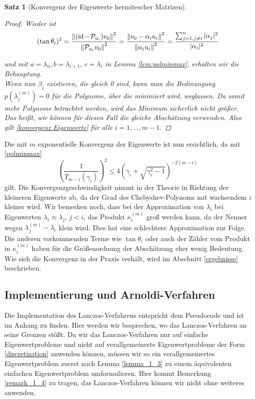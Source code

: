 \documentclass{article}
\theoremstyle{plain}
\newtheorem{theorem}    {Satz}   [section]
\begin{document}
\begin{theorem}[Konvergenz der Eigenwerte hermitescher Matrizen]
\begin{proof}
	Wieder ist
	\begin{equation*}
		(\tan\theta_i)^2 = \frac{{\left \| (\operatorname{id} - \mathcal{P}_{u_i})v_0 \right \|}_{}^2}{{\left \|  \mathcal{P}_{u_i}v_0 \right \|}_{}^2} = \frac{{\left \| v_0 - \alpha_i u_i \right \|}_{}^2}{{\left \| \alpha_i u_i \right \|}_{}^2} = \frac{\sum_{\substack{j=1, j\neq i}}^{n} |\alpha_j|^2}{|\alpha_i|^2}
	\end{equation*}

	und  mit $a = \lambda_n, b= \lambda_{i+1}$, $c = \lambda_i$ in Lemma \ref{lem:polminmax}, erhalten wir die Behauptung.\\

	Wenn nun $\beta_j$ existieren, die gleich 0 sind, kann man die Bedinungung $p(\lambda_j^{(m)}) = 0$ für die Polynome, über die minimiert wird, weglassen.
	Da somit mehr Polynome betrachtet werden, wird das Minimum sicherlich nicht größer. Das heißt, wir können für diesen Fall die gleiche Abschätzung verwenden.
	Also gilt \eqref{konvergenz Eigenwerte} für alle $i = 1, \dots, m-1$.
	\end{proof}
\end{theorem}

Die mit $m$ exponentielle Konvergenz der Eigenwerte ist nun ersichtlich, da mit \eqref{polminmax}
\begin{equation*}
	\left(\frac{1}{T_{m-i}(\gamma_i)}\right)^2 \le 4 \left(\gamma_i + \sqrt{\gamma_i^2 -1}\right)^{-2(m-i)}
\end{equation*}
gilt. Die Konvergenzgeschwindigkeit nimmt in der Theorie in Richtung der kleineren Eigenwerte ab, da der Grad des Chebyshev-Polynoms mit wachsendem $i$ kleiner wird. Wir bemerken noch, dass bei der Approximation von $\lambda_i$ bei Eigenwerten $\lambda_i \approx \lambda_j, \, j < i$, das Produkt $\kappa_i^{(m)}$ groß werden kann, da der Nenner wegen $\lambda^{(m)}_j - \lambda_i$ klein wird. Dies hat eine schlechtere Approximation zur Folge. Die anderen vorkommenden Terme wie $\tan \theta_i$ oder auch der Zähler vom Produkt in $\kappa_i^{(m)}$ haben für die Größenordnung der Abschätzung eher wenig Bedeutung. Wie sich die Konvergenz in der Praxis verhält, wird im Abschnitt \ref{ergebnisse} beschrieben.


\subsection{Implementierung und Arnoldi-Verfahren}

Die Implementation des Lanczos-Verfahrens entspricht dem Pseudocode und ist im Anhang zu finden. Hier werden wir besprechen, wo das Lanczos-Verfahren an seine Grenzen stößt. Da wir das Lanczos-Verfahren nur auf einfache Eigenwertprobleme und nicht auf verallgemeinerte Eigenwertprobleme der Form \eqref{discretization} anwenden können, müssen wir so ein verallgemeinertes Eigenwertproblem zuerst nach Lemma \ref{lemma_1_3} zu einem äquivalenten einfachen Eigenwertproblem umformulieren. Hier kommt Bemerkung \ref{remark_1_4} zu tragen, das Lanczos-Verfahren können wir nicht ohne weiteres anwenden.
\end{document}
